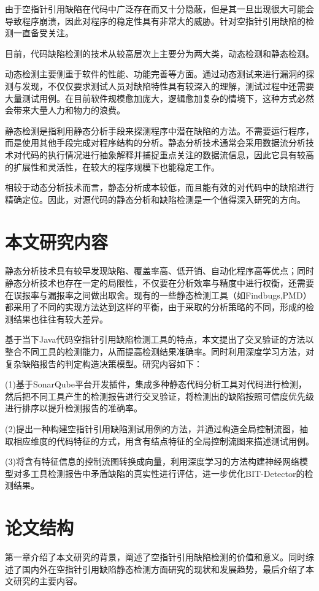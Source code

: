 由于空指针引用缺陷在代码中广泛存在而又十分隐蔽，但是其一旦出现很大可能会导致程序崩溃，因此对程序的稳定性具有非常大的威胁。针对空指针引用缺陷的检测一直备受关注。

目前，代码缺陷检测的技术从较高层次上主要分为两大类，动态检测\cite{wei2009safety}和静态检测\cite{lin2008static}。

动态检测主要侧重于软件的性能、功能完善等方面。通过动态测试来进行漏洞的探测与发现，不仅仅要求测试人员对缺陷特性具有较深入的理解，测试过程中还需要大量测试用例。在目前软件规模愈加庞大，逻辑愈加复杂的情境下，这种方式必然会带来大量人力和物力的浪费。

静态检测是指利用静态分析手段来探测程序中潜在缺陷的方法。不需要运行程序，而是使用其他手段完成对程序结构的分析。静态分析技术通常会采用数据流分析技术对代码的执行情况进行抽象解释并捕捉重点关注的数据流信息，因此它具有较高的扩展性和灵活性，在较大的程序规模下也能稳定工作。

相较于动态分析技术而言，静态分析成本较低，而且能有效的对代码中的缺陷进行精确定位。因此，对源代码的静态分析和缺陷检测是一个值得深入研究的方向。


\section{本文研究内容}
静态分析技术具有较早发现缺陷、覆盖率高、低开销、自动化程序高等优点；同时静态分析技术也存在一定的局限性，不仅要在分析效率与精度中进行权衡，还需要在误报率与漏报率之间做出取舍。现有的一些静态检测工具（如Findbugs,PMD）都采用了不同的实现方法达到这样的平衡，由于采取的分析策略的不同，形成的检测结果也往往有较大差异。

基于当下Java代码空指针引用缺陷检测工具的特点，本文提出了交叉验证的方法以整合不同工具的检测能力，从而提高检测结果准确率。同时利用深度学习方法，对复杂缺陷报告的判定构造决策模型。研究内容如下：

(1)基于SonarQube平台开发插件，集成多种静态代码分析工具对代码进行检测，然后把不同工具产生的检测报告进行交叉验证，将检测出的缺陷按照可信度优先级进行排序以提升检测报告的准确率。

(2)提出一种构建空指针引用缺陷测试用例的方法，并通过构造全局控制流图，抽取相应维度的代码特征的方式，用含有结点特征的全局控制流图来描述测试用例。

(3)将含有特征信息的控制流图转换成向量，利用深度学习的方法构建神经网络模型对多工具检测报告中矛盾缺陷的真实性进行评估，进一步优化BIT-Detector的检测结果。

\section{论文结构}
第一章介绍了本文研究的背景，阐述了空指针引用缺陷检测的价值和意义。同时综述了国内外在空指针引用缺陷静态检测方面研究的现状和发展趋势，最后介绍了本文研究的主要内容。

